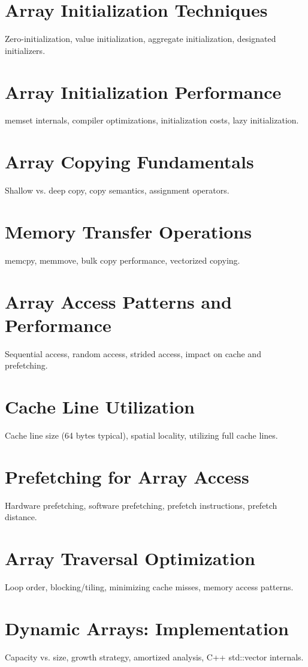 \chapter{Array Initialization Techniques}
Zero-initialization, value initialization, aggregate initialization, designated initializers.

\chapter{Array Initialization Performance}
memset internals, compiler optimizations, initialization costs, lazy initialization.

\chapter{Array Copying Fundamentals}
Shallow vs. deep copy, copy semantics, assignment operators.

\chapter{Memory Transfer Operations}
memcpy, memmove, bulk copy performance, vectorized copying.

\chapter{Array Access Patterns and Performance}
Sequential access, random access, strided access, impact on cache and prefetching.

\chapter{Cache Line Utilization}
Cache line size (64 bytes typical), spatial locality, utilizing full cache lines.

\chapter{Prefetching for Array Access}
Hardware prefetching, software prefetching, prefetch instructions, prefetch distance.

\chapter{Array Traversal Optimization}
Loop order, blocking/tiling, minimizing cache misses, memory access patterns.

\chapter{Dynamic Arrays: Implementation}
Capacity vs. size, growth strategy, amortized analysis, C++ std::vector internals.

